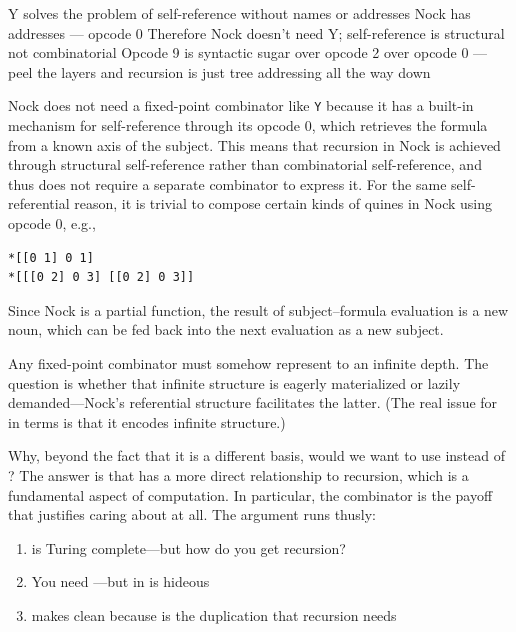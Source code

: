 Y solves the problem of self-reference without names or addresses
Nock has addresses — opcode 0
Therefore Nock doesn't need Y; self-reference is structural not combinatorial
Opcode 9 is syntactic sugar over opcode 2 over opcode 0 — peel the layers and recursion is just tree addressing all the way down

Nock does not need a fixed-point combinator like \texttt{Y} because it has a built-in mechanism for self-reference through its opcode 0, which retrieves the formula from a known axis of the subject.  This means that recursion in Nock is achieved through structural self-reference rather than combinatorial self-reference, and thus does not require a separate combinator to express it.  For the same self-referential reason, it is trivial to compose certain kinds of quines in Nock using opcode 0, e.g.,

\begin{lstlisting}[style=listingcomb]
*[[0 1] 0 1]
*[[[0 2] 0 3] [[0 2] 0 3]]
\end{lstlisting}

\noindent
Since Nock is a partial function, the result of subject--formula evaluation is a new noun, which can be fed back into the next evaluation as a new subject.

Any fixed-point combinator must somehow represent  to an infinite depth.  The question is whether that infinite structure is eagerly materialized or lazily demanded---Nock's referential structure facilitates the latter.  (The real issue for  in  terms is that it encodes infinite structure.)

Why, beyond the fact that it is a different basis, would we want to use  instead of ?  The answer is that  has a more direct relationship to recursion, which is a fundamental aspect of computation.  In particular, the  combinator is the payoff that justifies caring about  at all.  The argument runs thusly:

\begin{enumerate}
  \item  {} is Turing complete---but how do you get recursion?
  \item  You need ---but  in  is hideous
  \item  {} makes  clean because  is the duplication that recursion needs
\end{enumerate}

